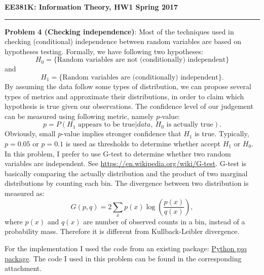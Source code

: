 \documentclass[11pt]{article}
\begin{document}
{\bf EE381K: Information Theory, HW1\hfill
  Spring 2017}
\vspace{-0.2in}
\begin{center}
\rule{6.5in}{0.5mm}
\end{center}
\textbf{Problem 4 (Checking independence)}: Most of the techniques used in checking (conditional) independence between random variables are based on hypotheses testing. Formally, we have following two hypotheses: 
$$
H_0 = \{\textrm{Random variables are not (conditionally) independent}\}
$$ 
and 
$$
H_1 = \{\textrm{Random variables are (conditionally) independent}\}.
$$
By assuming the data follow some types of distribution, we can propose several types of metrics and approximate their distributions, in order to claim which hypothesis is true given our observations. The confidence level of our judgement can be measured using following metric, namely $p$-value:
$$
p = P(\textrm{$H_1$ appears to be true}|data,~\textrm{$H_0$ is actually true}).
$$
Obviously, small $p$-value implies stronger confidence that $H_1$ is true. Typically, $p = 0.05$ or $p = 0.1$ is used as thresholds to determine whether accept $H_1$ or $H_0$. In this problem, I prefer to use G-test to determine whether two random variables are independent. See \href{https://en.wikipedia.org/wiki/G-test}{https://en.wikipedia.org/wiki/G-test}. G-test is basically comparing the actually distribution and the product of two marginal distributions by counting each bin. The divergence between two distribution is measured as:
$$
G(p,q) = 2\sum_{x}p(x)\log(\frac{p(x)}{q(x)}),
$$ 
where $p(x)$ and $q(x)$ are number of observed counts in a bin, instead of a probability mass. Therefore it is different from Kullback-Leibler divergence. 
 
For the implementation I used the code from an existing package: \href{https://github.com/keiichishima/gsq}{Python gsq package}. The code I used in this problem can be found in the corresponding attachment.
\end{document}
